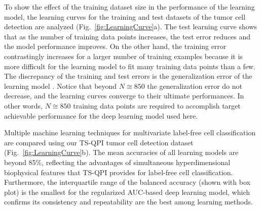 \documentclass[aps,pra,reprint,superscriptaddress]{revtex4-1}
\begin{document}
To show the effect of the training dataset size in the performance of the learning model, the learning curves for the training and test datasets of the tumor cell detection are analyzed (Fig.~\ref{fig:LearningCurve}a). The test learning curve shows that as the number of training data points increases, the test error reduces and the model performance improves. On the other hand, the training error contrastingly increases for a larger number of training examples because it is more difficult for the learning model to fit many training data points than a few. The discrepancy of the training and test errors is the generalization error of the learning model \cite{abu2012learning}. Notice that beyond $N \cong 850$ the generalization error do not decrease, and the learning curves converge to their ultimate performances. In other words, $N \cong 850$ training data points are required to accomplish target achievable performance for the deep learning model used here.

Multiple machine learning techniques for multivariate label-free cell classification are compared using our TS-QPI tumor cell detection dataset (Fig.~\ref{fig:LearningCurve}b). The mean accuracies of all learning models are beyond 85\%, reflecting the advantages of simultaneous hyperdimensional biophysical features that TS-QPI provides for label-free cell classification. Furthermore, the interquartile range of the balanced accuracy (shown with box plot) is the smallest for the regularized AUC-based deep learning model, which confirms its consistency and repeatability are the best among learning methods.
\end{document}

